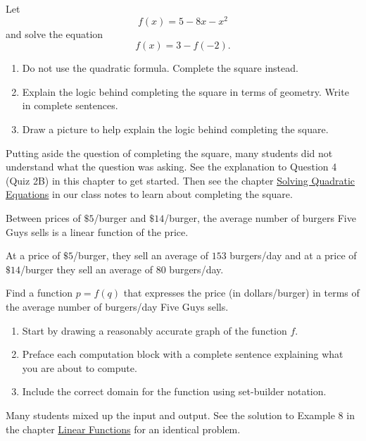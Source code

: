 \documentclass{ximera}
\begin{document}
\begin{question} \label{E333f3}
Let 
\[
   f(x) = 5 -8x - x^2
\]
and solve the equation
\[
      f(x) = 3-f(-2).
\]

\begin{enumerate}
\item Do not use the quadratic formula. Complete the square instead.

\item Explain the logic behind completing the square in terms of geometry. Write in complete sentences.

\item Draw a picture to help explain the logic behind completing the square.

\end{enumerate}

\begin{explanation}
Putting aside the question of completing the square, many students did not understand what the question was asking. See the explanation to Question 4 (Quiz 2B) in this chapter to get started. Then see the chapter \href{https://ximera.osu.edu/precalc1/PreCalculus1/SolvingQuadraticEqs/SolvingQuadraticEqs}{Solving Quadratic Equations} in our class notes to learn about completing the square.
\end{explanation}
\end{question}

\begin{question} \label{Q3mr3f3}
Between prices of $\$5$/burger and $\$14$/burger, the average number of burgers Five Guys sells is a linear function of the price. 

At a price of $\$5$/burger, they sell an average of $153$ burgers/day and at a price of $\$14$/burger they sell an average of $80$ burgers/day.

Find a function $p=f(q)$ that expresses the price (in dollars/burger) in terms of the average number of burgers/day Five Guys sells.

\begin{enumerate}
\item Start by drawing a reasonably accurate graph of the function $f$.

\item Preface each computation block with a complete sentence explaining what you are about to compute.

\item Include the correct domain for the function using set-builder notation.
\end{enumerate}

\begin{explanation}
Many students mixed up the input and output. See the solution to Example 8 in the chapter \href{https://ximera.osu.edu/precalc1/PreCalculus1/LinearFunctions/LinearFunctions}{Linear Functions} for an identical problem.
\end{explanation}
\end{question}
\end{document}
